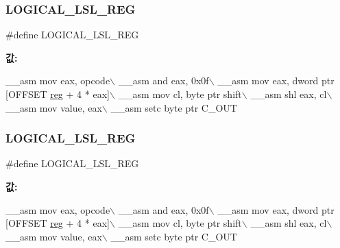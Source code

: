\mbox{\label{_g_b_a_8cpp_a5dfb563c49a31017ff7b8bb59c7503b6}} 
\subsubsection{\texorpdfstring{L\+O\+G\+I\+C\+A\+L\+\_\+\+L\+S\+L\+\_\+\+R\+EG}{LOGICAL\_LSL\_REG}\hspace{0.1cm}{\footnotesize\ttfamily [1/2]}}
{\footnotesize\ttfamily \#define L\+O\+G\+I\+C\+A\+L\+\_\+\+L\+S\+L\+\_\+\+R\+EG}

{\bfseries 값\+:}
\begin{DoxyCode}
\_\_asm mov eax, opcode\(\backslash\)
        \_\_asm and eax, 0x0f\(\backslash\)
        \_\_asm mov eax, dword ptr [OFFSET \mbox{\hyperlink{_g_b_a_8h_ae29faba89509024ffd1a292badcedf2d}{reg}} + 4 * eax]\(\backslash\)
        \_\_asm mov cl, byte ptr shift\(\backslash\)
        \_\_asm shl eax, cl\(\backslash\)
        \_\_asm mov value, eax\(\backslash\)
        \_\_asm setc byte ptr C\_OUT
\end{DoxyCode}
\mbox{\label{arm-new_8h_a5dfb563c49a31017ff7b8bb59c7503b6}} 
\subsubsection{\texorpdfstring{L\+O\+G\+I\+C\+A\+L\+\_\+\+L\+S\+L\+\_\+\+R\+EG}{LOGICAL\_LSL\_REG}\hspace{0.1cm}{\footnotesize\ttfamily [2/2]}}
{\footnotesize\ttfamily \#define L\+O\+G\+I\+C\+A\+L\+\_\+\+L\+S\+L\+\_\+\+R\+EG}

{\bfseries 값\+:}
\begin{DoxyCode}
\_\_asm mov eax, opcode\(\backslash\)
        \_\_asm and eax, 0x0f\(\backslash\)
        \_\_asm mov eax, dword ptr [OFFSET \mbox{\hyperlink{_g_b_a_8h_ae29faba89509024ffd1a292badcedf2d}{reg}} + 4 * eax]\(\backslash\)
        \_\_asm mov cl, byte ptr shift\(\backslash\)
        \_\_asm shl eax, cl\(\backslash\)
        \_\_asm mov value, eax\(\backslash\)
        \_\_asm setc byte ptr C\_OUT
\end{DoxyCode}


